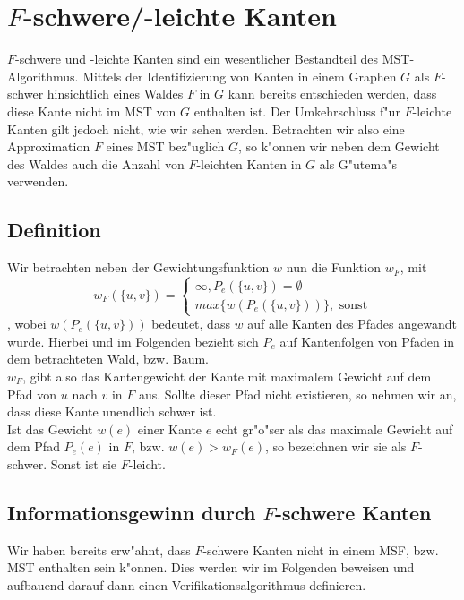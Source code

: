 \section{$F$-schwere/-leichte Kanten}
\label{sec:fEdg}

$F$-schwere und -leichte Kanten sind ein wesentlicher Bestandteil des 
    MST-Algorithmus. Mittels der Identifizierung von Kanten in einem Graphen $G$
    als $F$-schwer hinsichtlich eines Waldes $F$ in $G$ kann
    bereits entschieden werden, dass diese Kante nicht im MST von $G$ enthalten
    ist. Der Umkehrschluss f"ur $F$-leichte Kanten gilt jedoch nicht, wie wir
    sehen werden.
    Betrachten wir also eine Approximation $F$ eines MST bez"uglich $G$, so k"onnen
    wir neben dem Gewicht des Waldes auch die Anzahl von $F$-leichten Kanten in $G$ als
    G"utema"s verwenden.\\

\subsection{Definition}

Wir betrachten neben der Gewichtungsfunktion $w$ nun die Funktion $w_F$, mit
    $$
    w_F(\{u,v\}) =  \begin{cases}
                        \infty, P_e(\{u,v\}) = \emptyset\\
                        max\{w(P_e(\{u,v\}))\}, \text{ sonst}
                    \end{cases}
    $$
, wobei $w(P_e(\{u,v\}))$ bedeutet, dass $w$ auf alle Kanten des Pfades angewandt
    wurde. Hierbei und im Folgenden bezieht sich $P_e$ auf Kantenfolgen von 
    Pfaden in dem betrachteten Wald, bzw. Baum.\\
$w_F$, gibt also das Kantengewicht der Kante mit maximalem Gewicht auf dem
    Pfad von $u$ nach $v$ in $F$ aus. Sollte dieser Pfad nicht existieren, so
    nehmen wir an, dass diese Kante unendlich schwer ist.\\
Ist das Gewicht $w(e)$ einer Kante $e$ echt gr"o"ser als das maximale Gewicht auf dem 
    Pfad $P_e(e)$ in $F$, bzw. $w(e) > w_F(e)$, 
    so bezeichnen wir sie als $F$-schwer.
    Sonst ist sie $F$-leicht.

\subsection{Informationsgewinn durch $F$-schwere Kanten}

Wir haben bereits erw"ahnt, dass $F$-schwere Kanten nicht in einem MSF, bzw. MST
    enthalten sein k"onnen.
    Dies werden wir im Folgenden beweisen
    und aufbauend darauf dann einen Verifikationsalgorithmus definieren.\\

